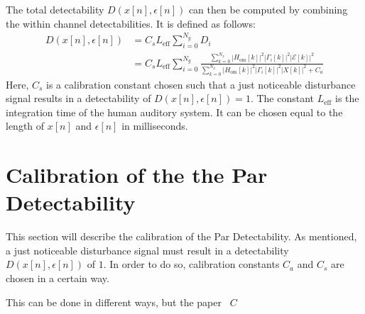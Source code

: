The total detectability $D(x[n],\epsilon[n])$ can then be computed by combining the within channel detectabilities.
It is defined as follows:
\begin{align}
    D(x[n],\epsilon[n]) &= C_s L_\text{eff}\sum_{i=0}^{N_g} D_i \\
                        &= C_s L_\text{eff}\sum_{i=0}^{N_g} 
                        \frac{\sum_{k=0}^{N_x}\left|H_\text{om}[k]\right|^2\left|
                            \Gamma_i[k]\right|^2\left|\mathcal{E}[k]\right|^2}
                        {\sum_{k=0}^{N_x}\left|H_\text{om}[k]\right|^2\left|
                            \Gamma_i[k]\right|^2\left|X[k]\right|^2 + C_a}
\end{align}
Here, $C_s$ is a calibration constant chosen such that a just noticeable disturbance signal results in a 
detectability of $D(x[n],\epsilon[n]) = 1$. 
The constant $L_\text{eff}$ is the integration time of the human auditory system.
It can be chosen equal to the length of $x[n]$ and $\epsilon[n]$ in milliseconds.  

\section{Calibration of the the Par Detectability}
This section will describe the calibration of the Par Detectability.
As mentioned, a just noticeable disturbance signal must result in a detectability $D(x[n],\epsilon[n])$ of $1$.
In order to do so, calibration constants $C_a$ and $C_s$ are chosen in a certain way.

This can be done in different ways, but the paper~\cite{van2005perceptual} 
$C$ 
